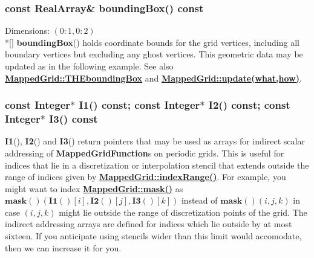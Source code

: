\documentclass{article}
\begin{document}
  \subsubsection{const RealArray\& boundingBox() const}
  \label{MappedGrid::boundingBox()}
    Dimensions: $(0\colon1,0\colon2)$ \\*[\parskip]
    \textbf{boundingBox}() holds coordinate bounds for the grid vertices, including all boundary vertices but excluding any ghost vertices.
    This geometric data may be updated as in the following example.
    See also {\bf{}\hyperref{THEboundingBox}{THEboundingBox \rm(\S}{)}{MappedGrid::THEboundingBox}}
    and {\bf{}\hyperref{update(what,how)}{update(what,how) \rm(\S}{)}{MappedGrid::update(what,how)}}.

  \subsubsection{const Integer$\ast$ I1() const; const Integer$\ast$ I2() const; const Integer$\ast$ I3() const}
  \label{MappedGrid::I1(),I2(),I3()}
    \textbf{I1}(), \textbf{I2}() and \textbf{I3}() return pointers that may be used as arrays for indirect scalar addressing
    of \textbf{MappedGridFunction}s on periodic grids.  This is useful for indices that lie in a discretization or interpolation
    stencil that extends outside the range of indices given by {\bf{}\hyperref{indexRange()}{indexRange() \rm(\S}{)}{MappedGrid::indexRange()}}.
    For example, you might want to index {\bf{}\hyperref{mask()}{mask() \rm(\S}{)}{MappedGrid::mask()}} as
    $\textbf{mask}()(\textbf{I1}()[i],\textbf{I2}()[j],\textbf{I3}()[k])$ instead of $\textbf{mask}()(i,j,k)$ in case $(i,j,k)$ might
    lie outside the range of discretization points of the grid.  The indirect addressing arrays are defined for indices which lie outside
    by at most sixteen.  If you anticipate using stencils wider than this limit would accomodate, then we can increase it for you.
\end{document}

